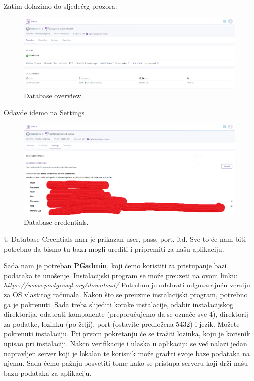 		 Zatim dolazimo do sljedećeg prozora:
			 
			 \begin{figure}[H]
			 	\includegraphics[scale=0.4]{slike/Datastores.png} 
			 	\centering
			 	\caption{ Database overview.}
			 	\label{DS}
			 \end{figure}
		 
		 	Odavde idemo na Settings.
		 	
		 	
		 	\begin{figure}[H]
		 		\includegraphics[scale=0.3]{slike/Datacredentials.png} 
		 		\centering
		 		\caption{ Database credentials.}
		 		\label{DS}
		 	\end{figure}
			 
			 U Database Creentials nam je prikazan user, pass, port, itd. Sve to će nam biti potrebno da bismo tu bazu mogli urediti i pripremiti za našu aplikaciju.
			 
			 Sada nam je potreban \textbf{PGadmin}, koji ćemo koristiti za pristupanje bazi podataka te unošenje. Instalacijski program se može preuzeti na ovom linku: \textit{https://www.postgresql.org/download/} Potrebno je odabrati odgovarajuću verziju za OS vlastitog računala. Nakon što se preuzme instalacijski program, potrebno ga je pokrenuti. Sada treba slijediti korake instalacije, odabir instalacijskog direktorija, odabrati komponente (preporučujemo da se označe sve 4), direktorij za podatke, lozinku (po želji), port (ostavite predložena 5432) i jezik. Možete pokrenuti instalaciju. Pri prvom pokretanju će se tražiti lozinka, koju je korisnik upisao pri instalaciji. Nakon verifikacije i ulaska u aplikaciju se već nalazi jedan napravljen server koji je lokalan te korisnik može graditi svoje baze podataka na njemu. Sada ćemo pažnju posvetiti tome kako se pristupa serveru koji drži našu bazu podataka za aplikaciju.
			 
